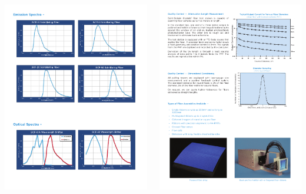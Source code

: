 \begin{frame}
\begin{columns}
\includegraphics[scale=0.5]{img/wlsStGobain.pdf}

\includegraphics[scale=0.5]{img/fibAttLength.pdf}


\end{columns}
\end{frame}
